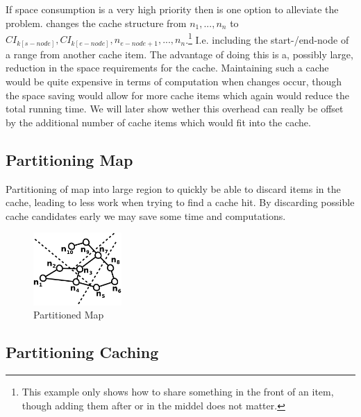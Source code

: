 \subsection{\sps}

If space consumption is a very high priority then \sps is one option to alleviate the problem. \sps changes the cache structure from $n_1, ... , n_n$ to $CI_{k\left[s-node\right]},CI_{k\left[e-node\right]}, n_{e-node+1}, ... , n_n$.\footnote{This example only shows how to share something in the front of an item, though adding them after or in the middel does not matter.}
I.e. including the start-/end-node of a range from another cache item. The advantage of doing this is a, possibly large, reduction in the space requirements for the cache. Maintaining such a cache would be quite expensive in terms of computation when changes occur, though the space saving would allow for more cache items which again would reduce the total running time. We will later show wether this overhead can really be offset by the additional number of cache items which would fit into the cache.


\subsection{Partitioning Map}\label{sec:partionmap}

Partitioning of map into large region to quickly be able to discard items in the cache, leading to less work when trying to find a cache hit. By discarding possible \spath cache candidates early we may save some time and computations.


\begin{figure}
  \center
	\includegraphics[width=0.30\textwidth]{figures/mapPartition.pdf}
	\caption{Partitioned Map}
  \label{fig:mappartition}
\end{figure}

\subsection{Partitioning Caching} 


